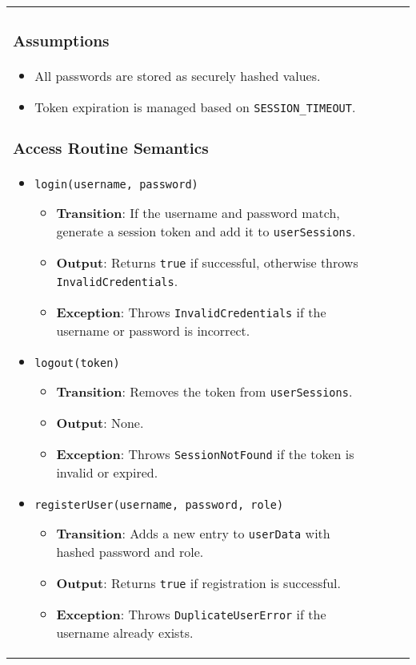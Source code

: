 \documentclass[12pt, titlepage]{article}
\begin{document}
\begin{itemize}
\begin{center}
\begin{tabular}{|p{3cm}|p{4cm}|p{4cm}|p{4cm}|}
\begin{itemize}
\subsubsection{Assumptions}

\begin{itemize}
    \item All passwords are stored as securely hashed values.
    \item Token expiration is managed based on \texttt{SESSION\_TIMEOUT}.
\end{itemize}

\subsubsection{Access Routine Semantics}

\begin{itemize}
    \item \texttt{login(username, password)}
    \begin{itemize}
        \item \textbf{Transition}: If the username and password match, generate a session token and add it to \texttt{userSessions}.
        \item \textbf{Output}: Returns \texttt{true} if successful, otherwise throws \texttt{InvalidCredentials}.
        \item \textbf{Exception}: Throws \texttt{InvalidCredentials} if the username or password is incorrect.
    \end{itemize}

    \item \texttt{logout(token)}
    \begin{itemize}
        \item \textbf{Transition}: Removes the token from \texttt{userSessions}.
        \item \textbf{Output}: None.
        \item \textbf{Exception}: Throws \texttt{SessionNotFound} if the token is invalid or expired.
    \end{itemize}

    \item \texttt{registerUser(username, password, role)}
    \begin{itemize}
        \item \textbf{Transition}: Adds a new entry to \texttt{userData} with hashed password and role.
        \item \textbf{Output}: Returns \texttt{true} if registration is successful.
        \item \textbf{Exception}: Throws \texttt{DuplicateUserError} if the username already exists.
    \end{itemize}


\end{itemize}
\end{itemize}
\end{tabular}
\end{center}
\end{itemize}
\end{document}
